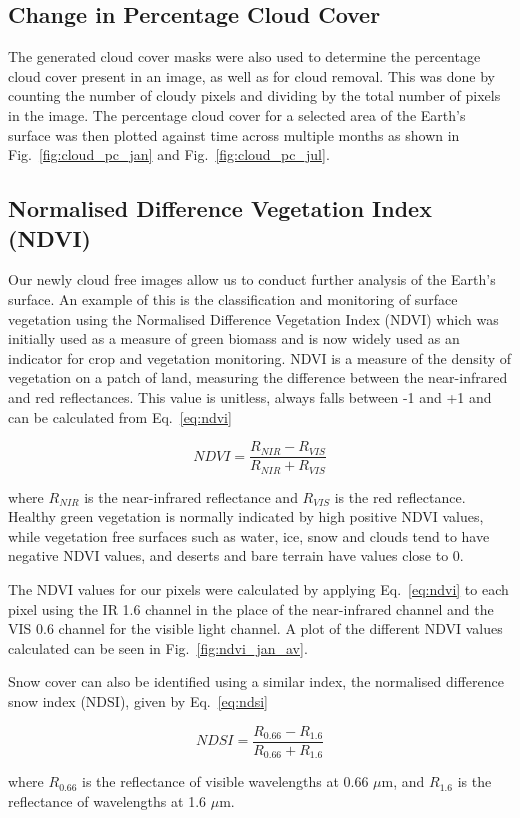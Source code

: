 \subsection{Change in Percentage Cloud Cover}

The generated cloud cover masks were also used to determine the percentage cloud cover present in an image, as well as for cloud removal. This was done by counting the number of cloudy pixels and dividing by the total number of pixels in the image. The percentage cloud cover for a selected area of the Earth's surface was then plotted against time across multiple months as shown in Fig.~\ref{fig:cloud_pc_jan} and Fig.~\ref{fig:cloud_pc_jul}.

\subsection{Normalised Difference Vegetation Index (NDVI)}
Our newly cloud free images allow us to conduct further analysis of the Earth's surface. An example of this is the classification and monitoring of surface vegetation using the Normalised Difference Vegetation Index (NDVI) which was initially used as a measure of green biomass and is now widely used as an indicator for crop and vegetation monitoring. NDVI is a measure of the density of vegetation on a patch of land, measuring the difference between the near-infrared and red reflectances. This value is unitless,  always falls between -1 and +1 and can be calculated from Eq.~\ref{eq:ndvi}

\begin{equation}\label{eq:ndvi}
    NDVI = \frac{R_{NIR}-R_{VIS}}{R_{NIR}+R_{VIS}}
\end{equation}

where $R_{NIR}$ is the near-infrared reflectance and $R_{VIS}$ is the red reflectance.
Healthy green vegetation is normally indicated by high positive NDVI values, while vegetation free surfaces such as water, ice, snow and clouds tend to have negative NDVI values, and deserts and bare terrain have values close to 0.

The NDVI values for our pixels were calculated by applying Eq.~\ref{eq:ndvi} to each pixel using the IR 1.6 channel in the place of the near-infrared channel and the VIS 0.6 channel for the visible light channel. A plot of the different NDVI values calculated can be seen in Fig.~\ref{fig:ndvi_jan_av}.

\par Snow cover can also be identified using a similar index, the normalised difference snow index (NDSI), given by Eq.~\ref{eq:ndsi}

\begin{equation}\label{eq:ndsi}
    NDSI = \frac{R_{0.66}-R_{1.6}}{R_{0.66}+R_{1.6}}
\end{equation}

where $R_{0.66}$ is the reflectance of visible wavelengths at 0.66 $\mu$m, and $R_{1.6}$ is the reflectance of wavelengths at 1.6 $\mu$m.






